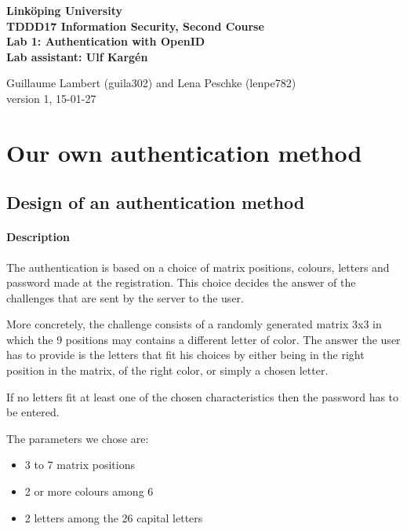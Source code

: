 \documentclass[11pt,a4paper]{article}
\begin{document}
	
\begin{center}
{\bfseries
Linköping University\\
TDDD17 Information Security, Second Course\\

Lab 1: Authentication with OpenID\\
Lab assistant: Ulf Kargén\\[10pt]}

Guillaume Lambert (guila302) and Lena Peschke (lenpe782)\\
version 1, 15-01-27
\end{center}

\hrulefill


\section*{Our own authentication method}
\subsection*{Design of an authentication method}
\paragraph{Description}

The authentication is based on a choice of matrix positions, colours, letters and password made at the registration.
This choice decides the answer of the challenges that are sent by the server to the user.

More concretely, the challenge consists of a randomly generated matrix 3x3 in which the 9 positions may contains a
different letter of color. The answer the user has to provide is the letters that fit his choices by either being in the
right position in the matrix, of the right color, or simply a chosen letter.

If no letters fit at least one of the chosen characteristics then the password has to be entered.

The parameters we chose are:
\begin{itemize}
\item 3 to 7 matrix positions
\item 2 or more colours among 6
\item 2 letters among the 26 capital letters
\end{itemize}
\end{document}

